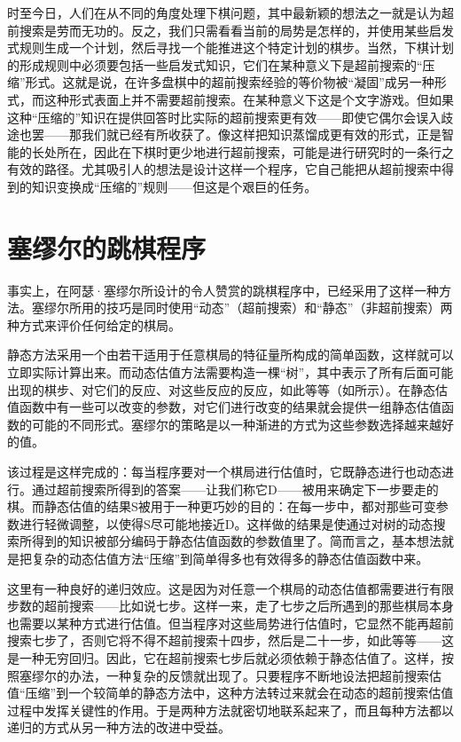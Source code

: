 时至今日，人们在从不同的角度处理下棋问题，其中最新颖的想法之一就是认为超前搜索是劳而无功的。反之，我们只需看看当前的局势是怎样的，并使用某些启发式规则生成一个计划，然后寻找一个能推进这个特定计划的棋步。当然，下棋计划的形成规则中必须要包括一些启发式知识，它们在某种意义下是超前搜索的“压缩”形式。这就是说，在许多盘棋中的超前搜索经验的等价物被“凝固”成另一种形式，而这种形式表面上并不需要超前搜索。在某种意义下这是个文字游戏。但如果这种“压缩的”知识在提供回答时比实际的超前搜索更有效——即使它偶尔会误入歧途也罢——那我们就已经有所收获了。像这样把知识蒸馏成更有效的形式，正是智能的长处所在，因此在下棋时更少地进行超前搜索，可能是进行研究时的一条行之有效的路径。尤其吸引人的想法是设计这样一个程序，它自己能把从超前搜索中得到的知识变换成“压缩的”规则——但这是个艰巨的任务。

\section{塞缪尔的跳棋程序}

事实上，在阿瑟·塞缪尔所设计的令人赞赏的跳棋程序中，已经采用了这样一种方法。塞缪尔所用的技巧是同时使用“动态”（超前搜索）和“静态”（非超前搜索）两种方式来评价任何给定的棋局。

静态方法采用一个由若干适用于任意棋局的特征量所构成的简单函数，这样就可以立即实际计算出来。而动态估值方法需要构造一棵“树”，其中表示了所有后面可能出现的棋步、对它们的反应、对这些反应的反应，如此等等（如所示）。在静态估值函数中有一些可以改变的参数，对它们进行改变的结果就会提供一组静态估值函数的可能的不同形式。塞缪尔的策略是以一种渐进的方式为这些参数选择越来越好的值。

该过程是这样完成的：每当程序要对一个棋局进行估值时，它既静态进行也动态进行。通过超前搜索所得到的答案——让我们称它D——被用来确定下一步要走的棋。而静态估值的结果S被用于一种更巧妙的目的：在每一步中，都对那些可变参数进行轻微调整，以使得S尽可能地接近D。这样做的结果是使通过对树的动态搜索所得到的知识被部分编码于静态估值函数的参数值里了。简而言之，基本想法就是把复杂的动态估值方法“压缩”到简单得多也有效得多的静态估值函数中来。

这里有一种良好的递归效应。这是因为对任意一个棋局的动态估值都需要进行有限步数的超前搜索——比如说七步。这样一来，走了七步之后所遇到的那些棋局本身也需要以某种方式进行估值。但当程序对这些局势进行估值时，它显然不能再超前搜索七步了，否则它将不得不超前搜索十四步，然后是二十一步，如此等等——这是一种无穷回归。因此，它在超前搜索七步后就必须依赖于静态估值了。这样，按照塞缪尔的办法，一种复杂的反馈就出现了。只要程序不断地设法把超前搜索估值“压缩”到一个较简单的静态方法中，这种方法转过来就会在动态的超前搜索估值过程中发挥关键性的作用。于是两种方法就密切地联系起来了，而且每种方法都以递归的方式从另一种方法的改进中受益。

